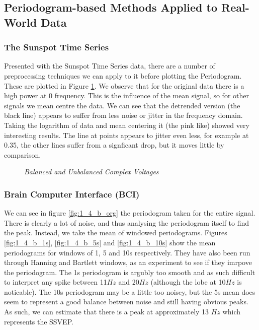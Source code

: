 \documentclass[./main.tex]{subfiles}
\begin{document}
\subsection{Periodogram-based Methods Applied to Real-World Data}

\subsubsection{The Sunspot Time Series}

Presented with the Sunspot Time Series data, there are a number of preprocessing techniques we can apply to it before plotting the Periodogram. These are plotted in Figure \ref{fig:1_4_a}. We observe that for the original data there is a high power at 0 frequency. This is the influence of the mean signal, so for other signals we mean centre the data. We can see that the detrended version (the black line) appears to suffer from less noise or jitter in the frequency domain. Taking the logarithm of data and mean centering it (the pink like) showed very interesting results. The line at points appears to jitter even less, for example at 0.35, the other lines suffer from a signficant drop, but it moves little by comparison.

\begin{figure}[h]
	\centering
	\resizebox{\textwidth}{!}{}
	\caption{\textit{Balanced and Unbalanced Complex Voltages}}
	\label{fig:1_4_a}
\end{figure}

\subsubsection{Brain Computer Interface (BCI)}

We can see in figure \ref{fig:1_4_b_org} the periodogram taken for the entire signal. There is clearly a lot of noise, and thus analysing the periodogram itself to find the peak. Instead, we take the mean of windowed periodograms. Figures \ref{fig:1_4_b_1s}, \ref{fig:1_4_b_5s} and \ref{fig:1_4_b_10s} show the mean periodograms for windows of 1, 5 and 10s respectively. They have also been run through Hanning and Bartlett windows, as an experiment to see if they imrpove the periodogram. The 1s periodogram is argubly too smooth and as such difficult to interpret any spike between 11$Hz$ and 20$Hz$ (although the lobe at 10$Hz$ is noticable). The 10s periodogram may be a little too noisey, but the 5s mean does seem to represent a good balance between noise and still having obvious peaks. As such, we can estimate that there is a peak at approximately 13 $Hz$ which represents the SSVEP.
\end{document}
